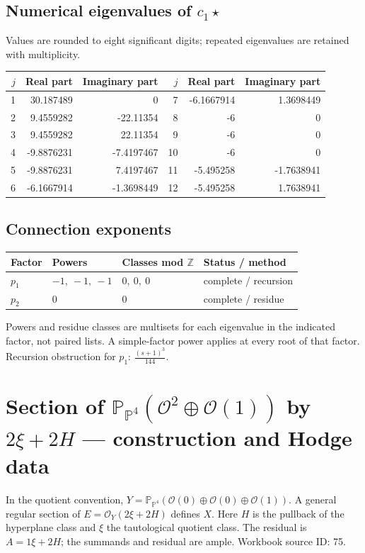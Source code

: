 \documentclass[10pt,a4paper]{article}
\begin{document}
\subsection*{Numerical eigenvalues of $c_1\star$}
Values are rounded to eight significant digits; repeated eigenvalues are retained with multiplicity.
\begin{center}\small\begin{tabular}{rrr@{\qquad}rrr}\toprule $j$ & Real part & Imaginary part & $j$ & Real part & Imaginary part\\\midrule
1 & 30.187489 & 0 & 7 & -6.1667914 & 1.3698449\\
2 & 9.4559282 & -22.11354 & 8 & -6 & 0\\
3 & 9.4559282 & 22.11354 & 9 & -6 & 0\\
4 & -9.8876231 & -7.4197467 & 10 & -6 & 0\\
5 & -9.8876231 & 7.4197467 & 11 & -5.495258 & -1.7638941\\
6 & -6.1667914 & -1.3698449 & 12 & -5.495258 & 1.7638941\\
\bottomrule\end{tabular}\end{center}
\subsection*{Connection exponents}
\begin{center}\begin{tabular}{llll}\toprule Factor & Powers & Classes mod $\mathbb Z$ & Status / method\\\midrule
$p_{1}$ & $-1,\ -1,\ -1$ & $0,\ 0,\ 0$ & complete / recursion\\
$p_{2}$ & $0$ & $0$ & complete / residue\\
\bottomrule\end{tabular}\end{center}
Powers and residue classes are multisets for each eigenvalue in the indicated factor, not paired lists. A simple-factor power applies at every root of that factor.
Recursion obstruction for $p_{1}$: $\frac{\left(s + 1\right)^{3}}{144}$.
\clearpage\section*{Section of $\mathbb P_{\mathbb P^{4}}(\mathcal O^{2}\oplus \mathcal O(1))$ by $2\xi +2H$ --- construction and Hodge data}\label{entry:PB5-075}
In the quotient convention, $Y=\mathbb P_{\mathbb P^{4}}(\mathcal O(0)\oplus\mathcal O(0)\oplus\mathcal O(1))$.
A general regular section of $E=\mathcal O_Y(2\xi+2H)$ defines $X$.
Here $H$ is the pullback of the hyperplane class and $\xi$ the tautological quotient class. The residual is $A=1\xi+2H$; the summands and residual are ample.
Workbook source ID: 75.
\end{document}
